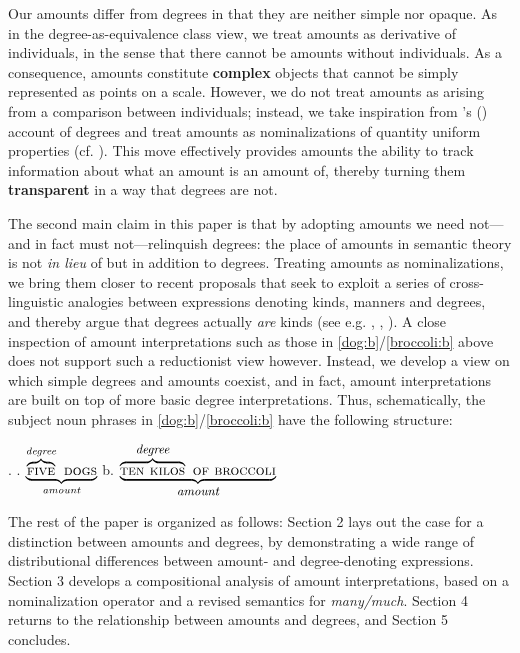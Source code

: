 \documentclass[a4paper,12pt,twoside]{article}
\newcommand{\posscitet}[1]{\citeauthor{#1}'s (\citeyear{#1})}
\begin{document}
	Our amounts differ from degrees in that they are neither simple nor opaque. As in the degree-as-equivalence class view, we treat amounts as derivative of individuals, in the sense that there cannot be amounts without individuals.  As a consequence, amounts constitute \textbf{complex} objects that cannot be simply represented as points on a scale. However, we do not treat amounts as arising from a comparison between individuals; instead, we take inspiration from \posscitet{Scontras:2017} account of degrees and treat amounts as nominalizations of quantity uniform properties (cf. \citealt{Mendia&Espinal:2024a}). This move effectively provides amounts the ability to track information about what an amount is an amount of, thereby turning them \textbf{transparent} in a way that degrees are not.
	
	The second main claim in this paper is that by adopting amounts we need not---and in fact must not---relinquish degrees: the place of amounts in semantic theory is not \textit{in lieu} of but in addition to degrees. Treating amounts as nominalizations, we bring them closer to recent proposals that seek to exploit a series of cross-linguistic analogies between expressions denoting kinds, manners and degrees, and thereby argue that degrees actually \textit{are} kinds (see e.g. \citealt{Landman&Morzycki:2003}, \citealt{Anderson&Morzycki:2015}, \citealt{Scontras:2017}).  A close inspection of amount interpretations such as those in \ref{dog:b}/\ref{broccoli:b} above does not support such a reductionist view however. Instead, we develop a view on which simple degrees and amounts coexist, and in fact, amount interpretations are built on top of more basic degree interpretations. Thus, schematically, the subject noun phrases in \ref{dog:b}/\ref{broccoli:b} have the following structure: 
	
	\ex. 
	\a. $\underbrace{\overbrace{\textsc{five}}^{\small \textit{degree}}\textsc{ dogs}}_{\small \textit{amount}}$	\qquad\qquad\qquad b. \hspace{.2cm} $\underbrace{\overbrace{\textsc{ten kilos}}^{\textit{\small degree}}\textsc{ of broccoli}}_\textit{\small amount}$
	
	The rest of the paper is organized as follows: Section 2 lays out the case for a distinction between amounts and degrees, by demonstrating a wide range of distributional differences between amount- and degree-denoting expressions. Section 3 develops a compositional analysis of amount interpretations, based on a nominalization operator and a revised semantics for \textit{many/much}. Section 4 returns to the relationship between amounts and degrees, and Section 5 concludes. 
	
\end{document}
